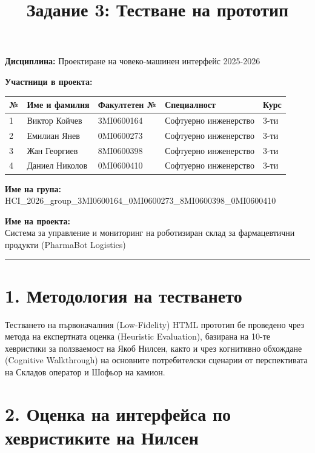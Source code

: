 \documentclass[12pt, a4paper]{article}
\title{Задание 3: Тестване на прототип}
\author{}
\date{}
\begin{document}
\maketitle

\noindent\textbf{Дисциплина:} Проектиране на човеко-машинен интерфейс 2025-2026

\bigskip

\noindent\textbf{Участници в проекта:}
\smallskip

\noindent
\begin{tabularx}{\textwidth}{|l|X|l|X|l|}
\hline
\textbf{№} & \textbf{Име и фамилия} & \textbf{Факултетен №} & \textbf{Специалност} & \textbf{Курс} \\ \hline
1 & Виктор Койчев & 3MI0600164 & Софтуерно инженерство & 3-ти \\ \hline
2 & Емилиан Янев & 0MI0600273 & Софтуерно инженерство & 3-ти \\ \hline
3 & Жан Георгиев & 8MI0600398 & Софтуерно инженерство & 3-ти \\ \hline
4 & Даниел Николов & 0MI0600410 & Софтуерно инженерство & 3-ти \\ \hline
\end{tabularx}

\bigskip

\noindent\textbf{Име на група:}\\
HCI\_2026\_group\_3MI0600164\_0MI0600273\_8MI0600398\_0MI0600410

\bigskip

\noindent\textbf{Име на проекта:}\\
Система за управление и мониторинг на роботизиран склад за фармацевтични продукти (PharmaBot Logistics)

\bigskip
\rule{\textwidth}{0.4pt}

\section*{1. Методология на тестването}

Тестването на първоначалния (Low-Fidelity) HTML прототип бе проведено чрез метода на експертната оценка (Heuristic Evaluation), базирана на 10-те хевристики за ползваемост на Якоб Нилсен, както и чрез когнитивно обхождане (Cognitive Walkthrough) на основните потребителски сценарии от перспективата на Складов оператор и Шофьор на камион.

\section*{2. Оценка на интерфейса по хевристиките на Нилсен}
\end{document}
